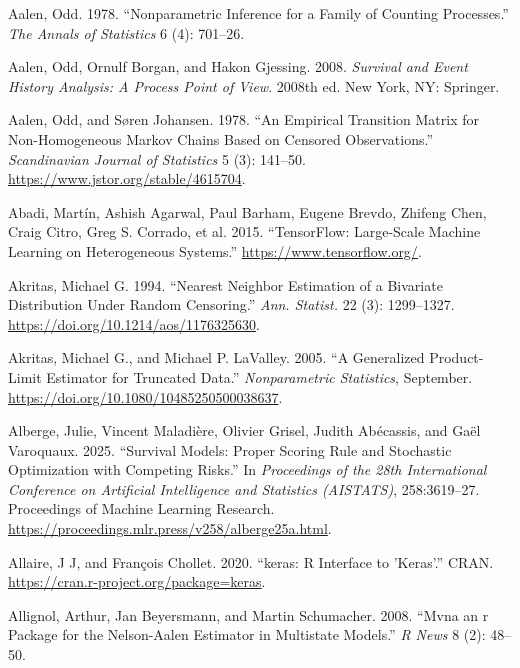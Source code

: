 \documentclass[
  letterpaper,
  krantz2]{style/krantz}
\newlength{\cslhangindent}
\newenvironment{CSLReferences}[2] %
 {\begin{list}{}{%
  \setlength{\itemindent}{0pt}
  \setlength{\leftmargin}{0pt}
  \setlength{\parsep}{0pt}
  \ifodd #1
   \setlength{\leftmargin}{\cslhangindent}
   \setlength{\itemindent}{-1\cslhangindent}
  \fi
  \setlength{\itemsep}{#2\baselineskip}}}
 {\end{list}}
\begin{document}
\label{refs}
\begin{CSLReferences}{1}{0}
Aalen, Odd. 1978. {``{Nonparametric Inference for a Family of Counting
Processes}.''} \emph{The Annals of Statistics} 6 (4): 701--26.

Aalen, Odd, Ornulf Borgan, and Hakon Gjessing. 2008. \emph{{Survival and
Event History Analysis: A Process Point of View}}. 2008th ed. New York,
NY: Springer.

Aalen, Odd, and Søren Johansen. 1978. {``An {Empirical Transition
Matrix} for {Non-Homogeneous Markov Chains Based} on {Censored
Observations}.''} \emph{Scandinavian Journal of Statistics} 5 (3):
141--50. \url{https://www.jstor.org/stable/4615704}.

Abadi, Martín, Ashish Agarwal, Paul Barham, Eugene Brevdo, Zhifeng Chen,
Craig Citro, Greg S. Corrado, et al. 2015. {``{TensorFlow: Large-Scale
Machine Learning on Heterogeneous Systems}.''}
\url{https://www.tensorflow.org/}.

Akritas, Michael G. 1994. {``{Nearest Neighbor Estimation of a Bivariate
Distribution Under Random Censoring}.''} \emph{Ann. Statist.} 22 (3):
1299--1327. \url{https://doi.org/10.1214/aos/1176325630}.

Akritas, Michael G., and Michael P. LaValley. 2005. {``A Generalized
Product-Limit Estimator for Truncated Data.''} \emph{Nonparametric
Statistics}, September. \url{https://doi.org/10.1080/10485250500038637}.

Alberge, Julie, Vincent Maladière, Olivier Grisel, Judith Abécassis, and
Gaël Varoquaux. 2025. {``{Survival Models: Proper Scoring Rule and
Stochastic Optimization with Competing Risks}.''} In \emph{Proceedings
of the 28th International Conference on Artificial Intelligence and
Statistics (AISTATS)}, 258:3619--27. Proceedings of Machine Learning
Research. \url{https://proceedings.mlr.press/v258/alberge25a.html}.

Allaire, J J, and François Chollet. 2020. {``{keras: R Interface to
'Keras'}.''} CRAN. \url{https://cran.r-project.org/package=keras}.

Allignol, Arthur, Jan Beyersmann, and Martin Schumacher. 2008. {``Mvna\:
an r Package for the Nelson-Aalen Estimator in Multistate Models.''}
\emph{R News} 8 (2): 48--50.


\end{CSLReferences}
\end{document}
